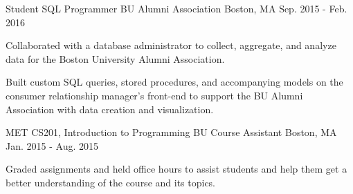 \begin{cventries}

\cventry
{Student SQL Programmer} %
{BU Alumni Association} %
{Boston, MA} %
{Sep. 2015 - Feb. 2016} %
{ %
\begin{cvitems}
\item {Collaborated with a database administrator to collect, aggregate, and analyze
data for the Boston University Alumni Association.}
\item {Built custom SQL queries, stored procedures, and accompanying models on
the consumer relationship manager's front-end to support the BU Alumni
Association with data creation and visualization.}
\end{cvitems}
}


\cventry
{MET CS201, Introduction to Programming} %
{BU Course Assistant} %
{Boston, MA} %
{Jan. 2015 - Aug. 2015} %
{ %
\begin{cvitems}
\item {Graded assignments and held office hours to assist students and help them
get a better understanding of the course and its topics.}
\end{cvitems}
}


\end{cventries}
